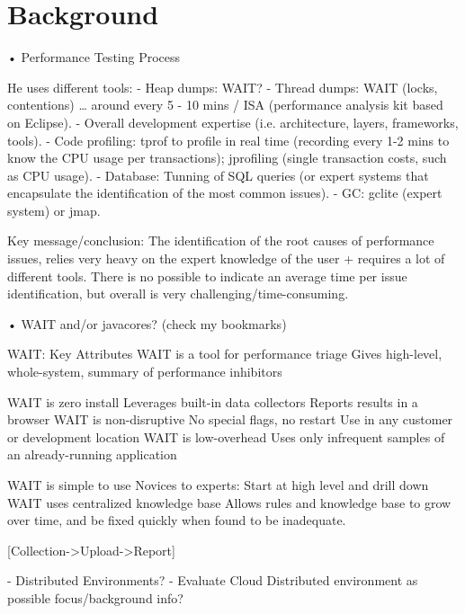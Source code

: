 \documentclass[runningheads,a4paper]{llncs}
\begin{document}

\section{Background}

•	Performance Testing Process

He uses different tools:
- Heap dumps: WAIT?
- Thread dumps: WAIT (locks, contentions) … around every 5 - 10 mins / ISA (performance analysis kit based on Eclipse).
- Overall development expertise (i.e. architecture, layers, frameworks, tools).
- Code profiling: tprof to profile in real time (recording every 1-2 mins to know the CPU usage per transactions); jprofiling (single transaction costs, such as CPU usage).
- Database: Tunning of SQL queries (or expert systems that encapsulate the identification of the most common issues).
- GC: gclite (expert system) or jmap.

Key message/conclusion: The identification of the root causes of performance issues, relies very heavy on the expert knowledge of the user + requires a lot of different tools. There is no possible to indicate an average time per issue identification, but overall is very challenging/time-consuming.


•	WAIT and/or javacores? (check my bookmarks)

WAIT:  Key Attributes
WAIT is a tool for performance triage
Gives high-level, whole-system, summary of performance inhibitors

WAIT is zero install
Leverages built-in data collectors
Reports results in a browser 					           
WAIT is non-disruptive
No special flags, no restart
Use in any customer or development location
WAIT is low-overhead
Uses only infrequent samples of an already-running application

WAIT is simple to use
Novices to experts:  Start at high level and drill down
WAIT uses centralized knowledge base
Allows rules and knowledge base to grow over time,
and be fixed quickly when found to be inadequate.

[Collection->Upload->Report]

- Distributed Environments? - Evaluate Cloud Distributed environment as possible focus/background info?
\end{document}
